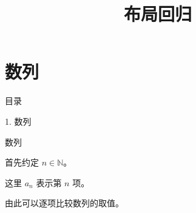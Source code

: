 \documentclass[aspectratio=169,10pt,fontset=fandol]{ctexbeamer}
\title{布局回归}
\begin{document}
\section{数列}
\begin{frame}[t,fragile]{目录}
\normalsize
{\color{blue}\normalsize 1. 数列\par}\vspace{0.22em}
\end{frame}
\begin{frame}[t,fragile]{数列}
\normalsize
{\normalsize
首先约定 $n\in\mathbb N$。


}
{\normalsize
这里 $a_n$ 表示第 $n$ 项。


}
{\normalsize
由此可以逐项比较数列的取值。
}
\end{frame}
\end{document}
